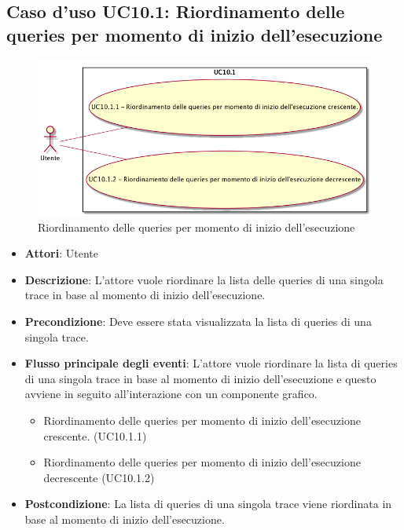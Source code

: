 \subsection{Caso d'uso UC10.1: Riordinamento delle queries per momento di inizio dell'esecuzione}
\begin{figure} [H]
\centering
\includegraphics[scale=0.45]{./UC/UC10-1.png}
\caption{Riordinamento delle queries per momento di inizio dell'esecuzione}\label{}
\end{figure}
\begin{itemize}
\item \textbf{Attori}: Utente
\item \textbf{Descrizione}: L'attore vuole riordinare la lista delle queries di una singola trace in base al momento di inizio dell'esecuzione.
\item \textbf{Precondizione}: Deve essere stata visualizzata la lista di queries di una singola trace.
\item \textbf{Flusso principale degli eventi}: L'attore vuole riordinare la lista di queries di una singola trace in base al momento di inizio dell'esecuzione e questo avviene in seguito all'interazione con un componente grafico.
\begin{itemize}
\item Riordinamento delle queries per momento di inizio dell'esecuzione crescente. (UC10.1.1)
\item Riordinamento delle queries per momento di inizio dell'esecuzione decrescente (UC10.1.2)
\end{itemize}
\item \textbf{Postcondizione}: La lista di queries di una singola trace viene riordinata in base al momento di inizio dell'esecuzione.
\end{itemize}
